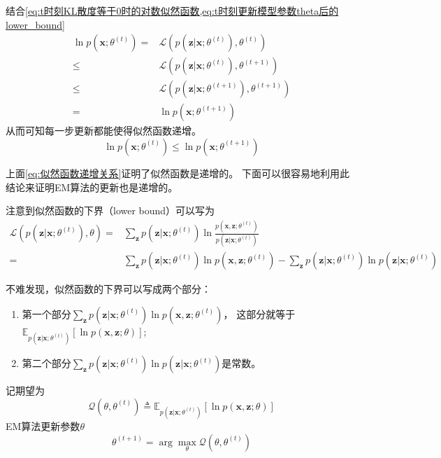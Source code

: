 \documentclass[withoutpreface,bwprint]{NoteBook}
\begin{document}
结合\cref{eq:t时刻KL散度等于0时的对数似然函数,eq:t时刻更新模型参数theta后的lower_bound}
\begin{align*}
    \ln p(\mathbf{x};\theta^{(t)}) 
    =& \mathcal{L}( p(\mathbf{z}|\mathbf{x};\theta^{(t)}),\theta^{(t)}) \nonumber \\
    \leq & \mathcal{L}( p(\mathbf{z}|\mathbf{x};\theta^{(t)}),\theta^{(t+1)}) \nonumber \\
    \leq & \mathcal{L}( p(\mathbf{z}|\mathbf{x};\theta^{(t+1)}),\theta^{(t+1)}) \nonumber \\
    =& \ln p(\mathbf{x};\theta^{(t+1)}) 
\end{align*}
从而可知每一步更新都能使得似然函数递增。
\begin{equation}
    \label{eq:似然函数递增关系}
    \ln p(\mathbf{x};\theta^{(t)}) \leq \ln p(\mathbf{x};\theta^{(t+1)}) 
\end{equation}

上面\cref{eq:似然函数递增关系}证明了似然函数是递增的。
下面可以很容易地利用此结论来证明EM算法的更新也是递增的。

注意到似然函数的下界（lower bound）可以写为
\begin{align}
    \label{eq:lower_bound的公式改写}
    \mathcal{L}(p(\mathbf{z}|\mathbf{x};\theta^{(t)}),\theta)
    =& \sum_{\mathbf{z}} p(\mathbf{z}| \mathbf{x}; \theta^{(t)}) \ln \frac{p(\mathbf{x},\mathbf{z};\theta^{(t)})}{p(\mathbf{z}|\mathbf{x};\theta^{(t)})} \nonumber \\
    =& \sum_{\mathbf{z}} p(\mathbf{z}| \mathbf{x}; \theta^{(t)}) \ln p(\mathbf{x},\mathbf{z};\theta^{(t)}) - \sum_{\mathbf{z}} p(\mathbf{z}| \mathbf{x}; \theta^{(t)}) \ln p(\mathbf{z}|\mathbf{x};\theta^{(t)})
\end{align}

不难发现，似然函数的下界可以写成两个部分：
\begin{enumerate}
    \item 第一个部分$\sum_{\mathbf{z}} p(\mathbf{z}| \mathbf{x}; \theta^{(t)}) \ln p(\mathbf{x},\mathbf{z};\theta^{(t)})$，
    这部分就等于$\mathbb{E}_{p(\mathbf{z}|\mathbf{x};\theta^{(t)})} \left[ \ln p(\mathbf{x},\mathbf{z};\theta)\right]$;
    \item 第二个部分$\sum_{\mathbf{z}} p(\mathbf{z}| \mathbf{x}; \theta^{(t)}) \ln p(\mathbf{z}|\mathbf{x};\theta^{(t)})$是常数。
\end{enumerate}

记期望为
\begin{equation}
    \label{eq:EM算法的期望计算}
    \mathcal{Q}(\theta,\theta^{(t)}) \triangleq \mathbb{E}_{p(\mathbf{z}|\mathbf{x};\theta^{(t)})} \left[ \ln p(\mathbf{x},\mathbf{z};\theta)\right]
\end{equation}
EM算法更新参数$\theta$
\begin{equation}
    \theta^{(t+1)} = \arg\max_\theta \mathcal{Q}(\theta,\theta^{(t)}) 
\end{equation}
\end{document}
